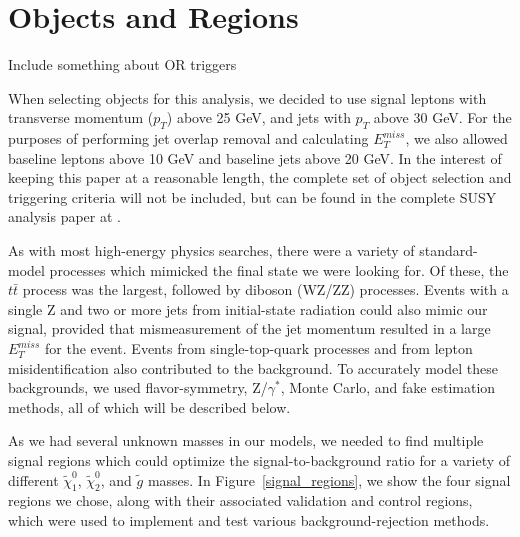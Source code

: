 \chapter{Objects and Regions}

Include something about OR triggers

When selecting objects for this analysis, we decided to use signal leptons with transverse momentum ($p_T$) above 25 GeV, and jets with $p_T$ above 30 GeV. For the purposes of performing jet overlap removal and calculating $E_T^{miss}$, we also allowed baseline leptons above 10 GeV and baseline jets above 20 GeV. In the interest of keeping this paper at a reasonable length, the complete set of object selection and triggering criteria will not be included, but can be found in the complete SUSY analysis paper at \cite{SUSY_2l2j}.

As with most high-energy physics searches, there were a variety of standard-model processes which mimicked the final state we were looking for. Of these, the $t\bar{t}$ process was the largest, followed by diboson (WZ/ZZ) processes. Events with a single Z and two or more jets from initial-state radiation could also mimic our signal, provided that mismeasurement of the jet momentum resulted in a large $E_T^{miss}$ for the event. Events from single-top-quark processes and from lepton misidentification also contributed to the background. To accurately model these backgrounds, we used flavor-symmetry, Z/$\gamma^*$, Monte Carlo, and fake estimation methods, all of which will be described below.

As we had several unknown masses in our models, we needed to find multiple signal regions which could optimize the signal-to-background ratio for a variety of different $\tilde{\chi}^0_1$, $\tilde{\chi}^0_2$, and $\tilde{g}$ masses. In Figure~\ref{signal_regions}, we show the four signal regions we chose, along with their associated validation and control regions, which were used to implement and test various background-rejection methods.